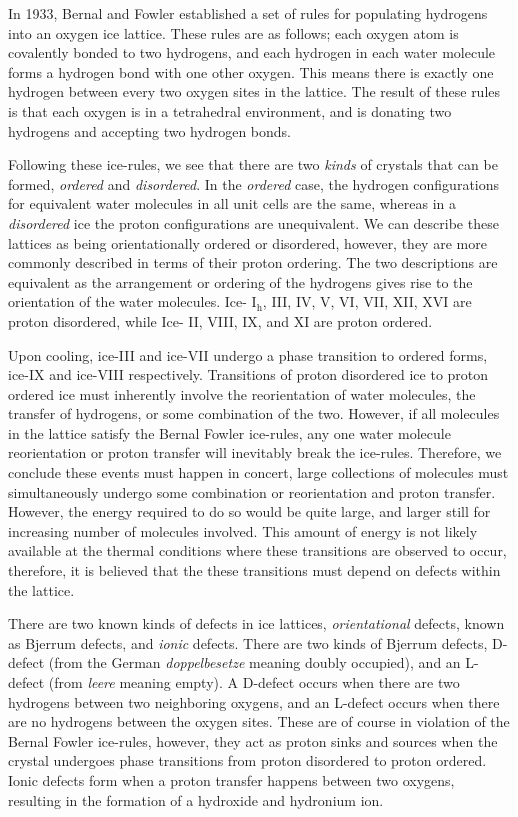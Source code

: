 In 1933, Bernal and Fowler established a set of rules for populating
hydrogens into an oxygen ice lattice.\cite{Bernal1933} These rules are
as follows; each oxygen atom is covalently bonded to two hydrogens,
and each hydrogen in each water molecule forms a hydrogen bond with
one other oxygen. This means there is exactly one hydrogen between
every two oxygen sites in the lattice. The result of these rules is
that each oxygen is in a tetrahedral environment, and is donating two
hydrogens and accepting two hydrogen bonds.

Following these ice-rules, we see that there are two \textit{kinds} of
crystals that can be formed, \textit{ordered} and
\textit{disordered}. In the \textit{ordered} case, the hydrogen
configurations for equivalent water molecules in all unit cells are
the same, whereas in a \textit{disordered} ice the proton
configurations are unequivalent. We can describe these lattices as
being orientationally ordered or disordered, however, they are more
commonly described in terms of their proton ordering. The two
descriptions are equivalent as the arrangement or ordering of the
hydrogens gives rise to the orientation of the water molecules.  Ice-
I$_\mathrm{h}$, III, IV, V, VI, VII, XII, XVI are proton disordered,
while Ice- II, VIII, IX, and XI are proton ordered.

Upon cooling, ice-III and ice-VII undergo a phase transition to
ordered forms, ice-IX and ice-VIII respectively. Transitions of proton
disordered ice to proton ordered ice must inherently involve the
reorientation of water molecules, the transfer of
hydrogens, or some combination of the two. However, if all molecules
in the lattice satisfy the Bernal Fowler ice-rules, any one water
molecule reorientation or proton transfer will inevitably break the
ice-rules. Therefore, we conclude these events must happen in concert,
large collections of molecules must simultaneously undergo some
combination or reorientation and proton transfer. However, the energy
required to do so would be quite large, and larger still for
increasing number of molecules involved. This amount of energy is not
likely available at the thermal conditions where these transitions are
observed to occur, therefore, it is believed that the these
transitions must depend on defects within the lattice.

There are two known kinds of defects in ice
lattices, \textit{orientational} defects, known as Bjerrum defects,
and \textit{ionic} defects. There are two kinds of Bjerrum defects,
D-defect (from the German \textit{doppelbesetze} meaning doubly
occupied), and an L-defect (from \textit{leere} meaning empty). A
D-defect occurs when there are two hydrogens between two neighboring
oxygens, and an L-defect occurs when there are no hydrogens between
the oxygen sites. These are of course in violation of the Bernal
Fowler ice-rules, however, they act as proton sinks and sources when
the crystal undergoes phase transitions from proton disordered to
proton ordered. Ionic defects form when a proton transfer happens
between two oxygens, resulting in the formation of a hydroxide and
hydronium ion.

